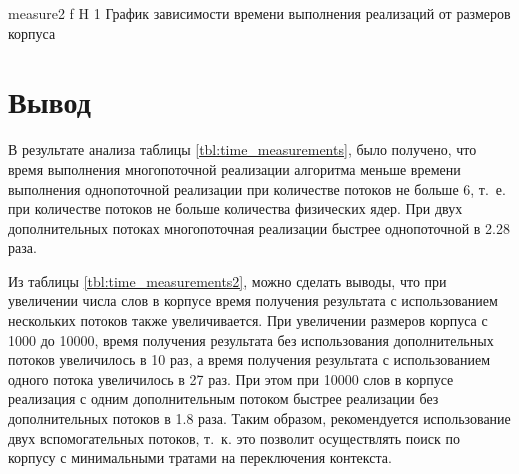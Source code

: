 {measure2} %
{f} %
{H} %
{1\textwidth} %
{График зависимости времени выполнения реализаций от размеров корпуса} %


\section*{Вывод}

В результате анализа таблицы \ref{tbl:time_measurements}, было получено, что время выполнения многопоточной реализации алгоритма меньше времени выполнения однопоточной реализации при количестве потоков не больше 6, т.~е. при количестве потоков не больше количества физических ядер. При двух дополнительных потоках многопоточная реализации быстрее однопоточной в 2.28 раза.

Из таблицы \ref{tbl:time_measurements2}, можно сделать выводы, что при увеличении числа слов в корпусе время получения результата с использованием нескольких
потоков также увеличивается. 
При увеличении размеров корпуса с
1000 до 10000, время получения результата без использования дополнительных потоков
увеличилось в 10 раз, а время получения результата с использованием одного потока увеличилось в 27 раз. 
При этом при 10000 слов в корпусе реализация с одним дополнительным потоком быстрее реализации без дополнительных потоков в 1.8 раза. 
Таким образом, рекомендуется использование
двух вспомогательных потоков, т.~к. это позволит осуществлять поиск по корпусу с минимальными тратами на переключения контекста.